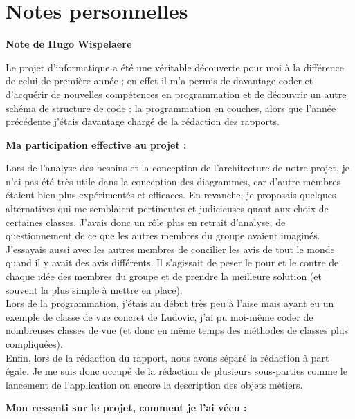 \documentclass[11pt]{article}
\begin{document}
\newpage

\section{Notes personnelles}

\textbf{\Large Note de Hugo Wispelaere}

Le projet d’informatique a été une véritable découverte pour moi à la différence de celui de première année ; en effet il m’a permis de davantage coder et d’acquérir de nouvelles compétences en programmation et de découvrir un autre schéma de structure de code : la programmation en couches, alors que l’année précédente j’étais davantage chargé de la rédaction des rapports.

\bigbreak
\textbf{ Ma participation effective au projet : }

Lors de l’analyse des besoins et la conception de l’architecture de notre projet, je n’ai pas été très utile dans la conception des diagrammes, car d'autre membres étaient bien plus expérimentés et efficaces. En revanche, je proposais quelques alternatives qui me semblaient pertinentes et judicieuses quant aux choix de certaines classes.  J’avais donc un rôle plus en retrait d’analyse, de questionnement de ce que les autres membres du groupe avaient imaginés. J'essayais aussi avec les autres membres de concilier les avis de tout le monde quand il y avait des avis différents. Il s’agissait de peser le pour et le contre de chaque idée des membres du groupe et de prendre la meilleure solution (et souvent la plus simple à mettre en place). \\ 

Lors de la programmation, j’étais au début très peu à l’aise mais ayant eu un exemple de classe de vue concret de Ludovic, j’ai pu moi-même coder de nombreuses classes de vue (et donc en même temps des méthodes de classes plus compliquées). \\ 

Enfin, lors de la rédaction du rapport, nous avons séparé la rédaction à part égale. Je me suis donc occupé de la rédaction de plusieurs sous-parties comme le lancement de l’application ou encore la description des objets métiers.

\bigbreak
\textbf{ Mon ressenti sur le projet, comment je l’ai vécu :  }
\end{document}
